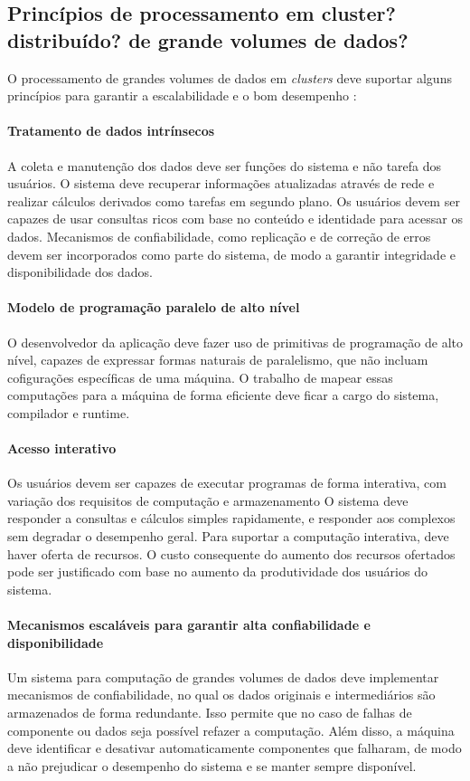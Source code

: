 \subsection{ Princípios de processamento em cluster? distribuído? de grande volumes de dados? }

O processamento de grandes volumes de dados em \textit{clusters} deve suportar alguns princípios para garantir a escalabilidade e o bom desempenho \cite{Bryant:2011}:



\paragraph{Tratamento de dados intrínsecos}
A coleta e manutenção dos dados deve ser funções do sistema e não tarefa dos usuários.  
O sistema deve recuperar informações atualizadas através de rede e realizar cálculos derivados como tarefas em segundo plano. Os usuários devem ser capazes de usar consultas ricos com base no conteúdo e identidade para acessar os dados. 
Mecanismos de confiabilidade, como replicação e de correção de erros devem ser incorporados como parte do sistema, de modo a garantir integridade e disponibilidade dos dados.

\paragraph{Modelo de programação paralelo de alto nível}
O desenvolvedor da aplicação deve fazer uso de primitivas de programação de alto nível, capazes de expressar formas naturais de paralelismo, que não incluam cofigurações específicas de uma máquina. O trabalho de mapear essas computações para a máquina de forma eficiente deve ficar a cargo do sistema, compilador e runtime.

\paragraph{Acesso interativo} 
Os usuários devem ser capazes de executar programas de forma interativa, com variação dos requisitos de computação e armazenamento O sistema deve responder a consultas e cálculos simples rapidamente, e responder aos complexos sem degradar o desempenho geral. Para suportar a computação interativa, deve haver oferta de recursos. O custo consequente do aumento dos recursos ofertados pode ser justificado com base no aumento da produtividade dos usuários do sistema.


\paragraph{Mecanismos escaláveis para garantir alta confiabilidade e disponibilidade}
Um sistema para computação de grandes volumes de dados deve implementar mecanismos de confiabilidade, no qual os dados originais e intermediários são armazenados de forma redundante. Isso permite que no caso de falhas de componente ou dados seja possível refazer a computação. Além disso, a máquina deve identificar e desativar automaticamente componentes que falharam, de modo a não prejudicar o desempenho do sistema e se manter sempre disponível. 


